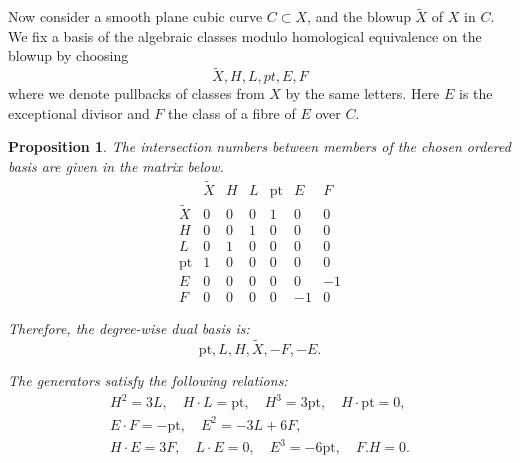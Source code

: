 \documentclass[11pt]{amsart}
\theoremstyle{plain}
\newtheorem{proposition}[theorem]{Proposition}
\numberwithin{equation}{section}
\theoremstyle{definition}
\theoremstyle{remark}
\begin{document}
Now consider a smooth plane cubic curve $C\subset X$, and the blowup $\widetilde{X}$ of $X$ in $C$. We fix a basis of the algebraic classes modulo homological equivalence on the blowup by choosing
\[
\widetilde{X}, H, L, pt, E, F 
\]
where we denote pullbacks of classes from $X$ by the same letters. Here $E$ is the exceptional divisor and $F$ the class of a fibre of $E$ over $C$. 



\begin{proposition}\label{pIntersectionMatrixCubicThreefold}
The intersection numbers between members of the chosen ordered basis are given in the matrix below. 
\[
\renewcommand{\arraystretch}{1.2}
\begin{array}{c|cccc|cc}
      & \widetilde{X} & H & L & \mathrm{pt} & E & F \\ \hline
\widetilde{X} & 0 & 0 & 0 & 1 & 0 & 0 \\
H             & 0 & 0 & 1 & 0 & 0 & 0 \\
L             & 0 & 1 & 0 & 0 & 0 & 0 \\
\mathrm{pt}   & 1 & 0 & 0 & 0 & 0 & 0 \\ \hline
E             & 0 & 0 & 0 & 0 & 0 & -1 \\
F             & 0 & 0 & 0 & 0 & -1 & 0 
\end{array}
\]

Therefore, the degree-wise dual basis is:
\[
\mathrm{pt}, L, H, \widetilde{X}, -F, -E.
\]

The generators satisfy the following relations:
\begin{gather*}
H^2 = 3L, \quad
H \cdot L = \mathrm{pt}, \quad
H^3 = 3\mathrm{pt}, \quad
H \cdot \mathrm{pt} = 0, \\
E \cdot F = -\mathrm{pt}, \quad
E^2 = -3L + 6F, \\
H \cdot E = 3F, \quad
L \cdot E = 0, \quad
E^3 = -6\mathrm{pt}, \quad
F. H =0. 
\end{gather*}
\end{proposition}
\end{document}
